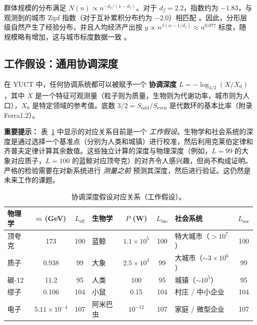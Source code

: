 \documentclass[11pt]{article}
\theoremstyle{remark}
\begin{document}
	群体规模的分布满足 \(N(n) \propto n^{-d_f/(1-d_f)}\)。对于 \(d_f = 2.2\)，指数约为 \(-1.83\)，与观测到的城市 Zipf 指数（对于互补累积分布约为 \(-2.0\)）相匹配 \cite{Fluschnik2016, Rybski2023}。因此，分形层级自然产生了经验分布，并且人均经济产出按 \(y \propto n^{\beta(\alpha - 1/d_f)} \approx n^{0.077}\) 标度，随规模略有增加，这与城市标度数据一致 \cite{Bettencourt2007}。
	
	\subsection{工作假设：通用协调深度}
	\label{sec:isomorphism}
	
	在 YUCT 中，任何协调系统都可以被赋予一个 \textbf{协调深度} \(L = -\log_{3/2}(X/X_0)\)，其中 \(X\) 是一个特征可观测量（粒子则为质量，生物则为代谢功率，城市则为人口），\(X_0\) 是特定领域的参考值。底数 \(3/2 = S_{\mathrm{odd}}/S_{\mathrm{even}}\) 是代数环的基本比率（附录 Ferra1.2）。
	
	\textbf{重要提示：} 表~\ref{tab:universal_depths} 中显示的对应关系目前是一个 \emph{工作假设}。生物学和社会系统的深度是通过选择一个基准点（分别为人类和城镇）进行校准，然后利用克莱伯定律和齐普夫定律计算其余数值。这些独立计算的深度与物理深度（例如，\(L=99\) 的大象对应质子，\(L=100\) 的蓝鲸对应顶夸克）的对齐令人感兴趣，但尚不构成证明。严格的检验需要在对新系统进行 \emph{测量之前} 预测其深度，然后进行验证。这仍然是未来工作的课题。
	
	\begin{table}[H]
		\centering
		\caption{协调深度假设对应关系（工作假设）。}
		\label{tab:universal_depths}
		\footnotesize
		\begin{tabular}{l c c l c c l c}
			\toprule
			\textbf{物理学} & \(m\) (GeV) & \(L_{\mathrm{eff}}\) & \textbf{生物学} & \(P\) (W) & \(L_{\mathrm{bio}}\) & \textbf{社会系统} & \(L_{\mathrm{soc}}\) \\
			\midrule
			顶夸克 & 173 & 100 & 蓝鲸 & \(1.1\times10^5\) & 100 & 特大城市（$>10^7$） & 100 \\
			质子 & 0.938 & 99 & 大象 & \(2.5\times10^3\) & 99 & 大城市（$\sim 3\times10^6$） & 99 \\
			碳-12 & 11.2 & 95 & 人类 & 100 & 95 & 城镇（$\sim 10^5$） & 95 \\
			缪子 & 0.106 & 104 & 小鼠 & 0.15 & 104 & 村庄 / 中小企业 & 104 \\
			电子 & \(5.11\times10^{-4}\) & 107 & 阿米巴虫 & \(10^{-12}\) & 107 & 家庭 / 微型企业 & 107 \\
			\bottomrule
		\end{tabular}
	\end{table}
	
\end{document}
